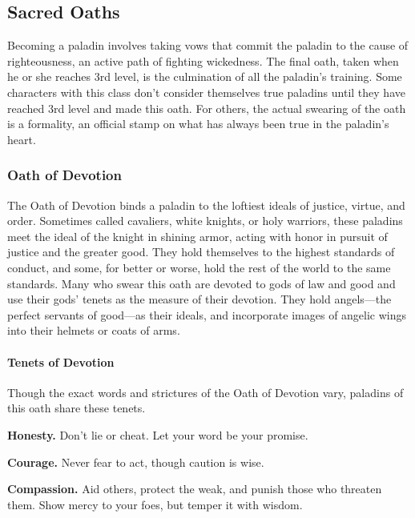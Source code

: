 \documentclass[
]{article}
\begin{document}
\hypertarget{sacred-oaths}{%
\subsection{Sacred Oaths}\label{sacred-oaths}}

Becoming a paladin involves taking vows that commit the paladin to the
cause of righteousness, an active path of fighting wickedness. The final
oath, taken when he or she reaches 3rd level, is the culmination of all
the paladin's training. Some characters with this class don't consider
themselves true paladins until they have reached 3rd level and made this
oath. For others, the actual swearing of the oath is a formality, an
official stamp on what has always been true in the paladin's heart.

\hypertarget{oath-of-devotion}{%
\subsubsection{Oath of Devotion}\label{oath-of-devotion}}

The Oath of Devotion binds a paladin to the loftiest ideals of justice,
virtue, and order. Sometimes called cavaliers, white knights, or holy
warriors, these paladins meet the ideal of the knight in shining armor,
acting with honor in pursuit of justice and the greater good. They hold
themselves to the highest standards of conduct, and some, for better or
worse, hold the rest of the world to the same standards. Many who swear
this oath are devoted to gods of law and good and use their gods' tenets
as the measure of their devotion. They hold angels---the perfect
servants of good---as their ideals, and incorporate images of angelic
wings into their helmets or coats of arms.

\hypertarget{tenets-of-devotion}{%
\paragraph{Tenets of Devotion}\label{tenets-of-devotion}}

Though the exact words and strictures of the Oath of Devotion vary,
paladins of this oath share these tenets.

\textbf{Honesty.} Don't lie or cheat. Let your word be your promise.

\textbf{Courage.} Never fear to act, though caution is wise.

\textbf{Compassion.} Aid others, protect the weak, and punish those who
threaten them. Show mercy to your foes, but temper it with wisdom.
\end{document}
